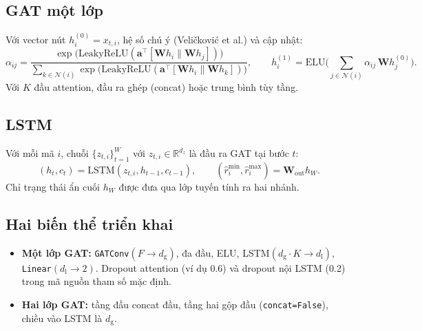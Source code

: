 \documentclass[12pt,a4paper]{article}
\begin{document}
\subsection{GAT một lớp}
Với vector nút $h^{(0)}_i = x_{t,i}$, hệ số chú ý (Veličković et al.) và cập nhật:
\begin{equation}
  \alpha_{ij} = \frac{\exp\!\big(\mathrm{LeakyReLU}(\mathbf{a}^\top [\mathbf{W}h_i \| \mathbf{W}h_j])\big)}
  {\sum_{k\in\mathcal{N}(i)} \exp\!\big(\mathrm{LeakyReLU}(\mathbf{a}^\top [\mathbf{W}h_i \| \mathbf{W}h_k])\big)}, \qquad
  h^{(1)}_i = \mathrm{ELU}\!\Big(\sum_{j\in\mathcal{N}(i)} \alpha_{ij}\,\mathbf{W}h^{(0)}_j\Big).
\end{equation}
Với $K$ đầu attention, đầu ra ghép (concat) hoặc trung bình tùy tầng.

\subsection{LSTM}
Với mỗi mã $i$, chuỗi $\{z_{t,i}\}_{t=1}^W$ với $z_{t,i}\in\mathbb{R}^{d_z}$ là đầu ra GAT tại bước $t$:
\begin{equation}
  (h_t, c_t) = \mathrm{LSTM}(z_{t,i}, h_{t-1}, c_{t-1}), \qquad
  (\hat r^{\min}_i, \hat r^{\max}_i) = \mathbf{W}_{\mathrm{out}} h_{W}.
\end{equation}
Chỉ trạng thái ẩn cuối $h_W$ được đưa qua lớp tuyến tính ra hai nhánh.

\subsection{Hai biến thể triển khai}
\begin{itemize}[leftmargin=1.5em]
  \item \textbf{Một lớp GAT:} \texttt{GATConv}$(F \to d_{\mathrm{g}})$, đa đầu, ELU, LSTM$(d_{\mathrm{g}}\cdot K \to d_{\mathrm{l}})$, \texttt{Linear}$(d_{\mathrm{l}} \to 2)$. Dropout attention (ví dụ 0.6) và dropout nội LSTM (0.2) trong mã nguồn tham số mặc định.
  \item \textbf{Hai lớp GAT:} tầng đầu concat đầu, tầng hai gộp đầu (\texttt{concat=False}), chiều vào LSTM là $d_{\mathrm{g}}$.
\end{itemize}
\end{document}
